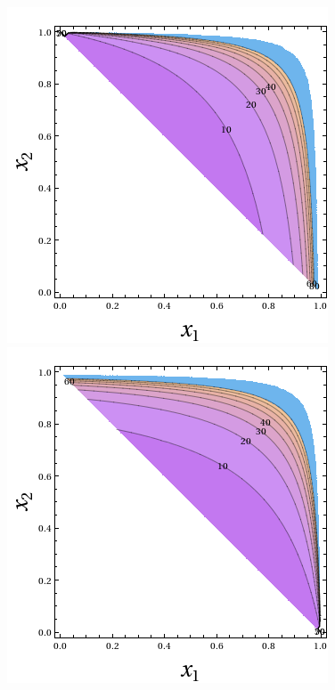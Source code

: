 \begin{figure}[h!]
\begin{center}
\begin{minipage}{0.45\linewidth}
\includegraphics[width=\linewidth]{images/ms1.png}
\end{minipage}%
\hfill
\begin{minipage}{0.45\linewidth}
\includegraphics[width=\linewidth]{images/sw.png}

\end{minipage}
\end{center}
\end{figure}
